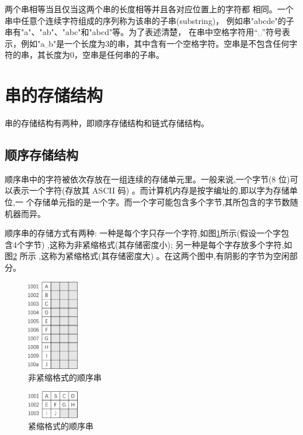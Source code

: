 \documentclass[lang=cn,newtx,10pt,scheme=chinese]{../elegantbook}
\begin{document}
两个串相等当且仅当这两个串的长度相等并且各对应位置上的字符都
相同。一个串中任意个连续字符组成的序列称为该串的子串(substring)，
例如串"abcde"的子串有"a"、"ab"、"abc"和"abcd"等。为了表述清楚，
在串中空格字符用“␣”符号表示，例如"a␣b"是一个长度为3的串，其中含有一个空格字符。空串是不包含任何字符的串，其长度为0，空串是任何串的子串。


\section{串的存储结构}

串的存储结构有两种，即顺序存储结构和链式存储结构。
\subsection{顺序存储结构}


顺序串中的字符被依次存放在一组连续的存储单元里。一般来说,一个字节(8 位)可
以表示一个字符(存放其 ASCII 码) 。而计算机内存是按字编址的,即以字为存储单位,一
个存储单元指的是一个字。而一个字可能包含多个字节,其所包含的字节数随机器而异。

顺序串的存储方式有两种: 一种是每个字只存一个字符,如图\ref{fig:seqString}所示(假设一个字包
含4个字节) ,这称为非紧缩格式(其存储密度小); 另一种是每个字存放多个字符,如图\ref{fig:tightSeqString}
所示 ,这称为紧缩格式(其存储密度大) 。在这两个图中,有阴影的字节为空闲部分。



\begin{figure}[h]
  \centering
  \includegraphics[width=0.2\textwidth]{./figure/pdf/cropped/narrowString.pdf}
  \caption{非紧缩格式的顺序串}
  \label{fig:seqString}
\end{figure}


\begin{figure}[h]
  \centering
  \includegraphics[width=0.2\textwidth]{./figure/pdf/cropped/notNarrowString.pdf}
  \caption{紧缩格式的顺序串}
  \label{fig:tightSeqString}
\end{figure}
\end{document}
